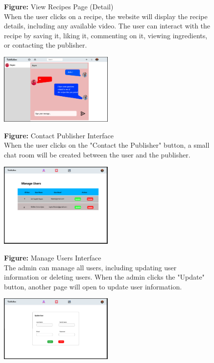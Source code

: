 \documentclass{article}
\begin{document}
{{{\begin{figure}[htbp]
    \textbf{Figure:} View Recipes Page (Detail) \\
    When the user clicks on a recipe, the website will display the recipe details, including any available video. The user can interact with the recipe by saving it, liking it, commenting on it, viewing ingredients, or contacting the publisher.
\end{figure}

\begin{figure}[htbp]
    \centering
    \includegraphics[width=0.5\textwidth]{Contact} 
    \vspace{0.5cm}
    
    \textbf{Figure:} Contact Publisher Interface \\
    When the user clicks on the "Contact the Publisher" button, a small chat room will be created between the user and the publisher.
\end{figure}

\begin{figure}[htbp]
    \centering
    \includegraphics[width=0.5\textwidth]{ManageUser} 
    \vspace{0.5cm}
    
    \textbf{Figure:} Manage Users Interface \\
    The admin can manage all users, including updating user information or deleting users. When the admin clicks the "Update" button, another page will open to update user information.
\end{figure}

\begin{figure}[htbp]
    \centering
    \includegraphics[width=0.5\textwidth]{UpdateUser} 
    \vspace{0.5cm}
    

\end{figure}}}}
\end{document}
